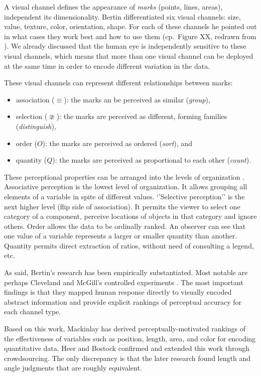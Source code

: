 \documentclass[
]{book}
\providecommand{\tightlist}{%
  \setlength{\itemsep}{0pt}\setlength{\parskip}{0pt}}
\begin{document}
A visual channel defines the appearance of \emph{marks} (points, lines, areas), independent its dimensionality. Bertin differentiated six visual channels: size, value, texture, color, orientation, shape. For each of these channels he pointed out in what cases they work best and how to use them (cp.~Figure XX, redrawn from \citep{MacDonald1999usingcolor}). We already discussed that the human eye is independently sensitive to these visual channels, which means that more than one visual channel can be deployed at the same time in order to encode different variation in the data.

These visual channels can represent different relationships between marks:

\begin{itemize}
\tightlist
\item
  association (\(\equiv\)): the marks an be perceived as similar (\emph{group}),
\item
  selection (\(\ncong\)): the marks are perceived as different, forming families (\emph{distinguish}),
\item
  order (\(O\)): the marks are perceived as ordered (\emph{sort}), and
\item
  quantity (\(Q\)): the marks are perceived as proportional to each other (\emph{count}).
\end{itemize}

These perceptional properties can be arranged into the levels of organization \citep{green1998toward}. Associative perception is the lowest level of organization. It allows grouping all elements of a variable in spite of different values. `'Selective perception'' is the next higher level (flip side of association). It permits the viewer to select one category of a component, perceive locations of objects in that category and ignore others. Order allows the data to be ordinally ranked. An observer can see that one value of a variable represents a larger or smaller quantity than another. Quantity permits direct extraction of ratios, without need of consulting a legend, etc.

As said, Bertin's research has been empirically substantiated. Most notable are perhaps Cleveland and McGill's controlled experiments \citep{ClevelandMcGill1984graphicalperception}. The most important findings is that they mapped human response directly to visually encoded abstract information and provide explicit rankings of perceptual accuracy for each channel type.

Based on this work, Mackinlay \citep{Mackinlay1986automatingdesign} has derived perceptually-motivated rankings of the effectiveness of variables such as position, length, area, and color for encoding quantitative data. Heer and Bostock \citep{HeerBostock2010crowdsourcing} confirmed and extended this work through crowdsourcing. The only discrepancy is that the later research found length and angle judgments that are roughly equivalent.
\end{document}
